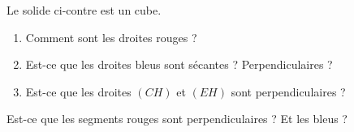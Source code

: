 
\begin{exercice}\label{exoSeconde-0087}

    \begin{multicols}{2}
            Le solide ci-contre est un cube. 
        \begin{enumerate}
            \item
        Comment sont les droites rouges ?
    \item
        Est-ce que les droites bleus sont sécantes ? Perpendiculaires ?
    \item
        Est-ce que les droites \( (CH)\) et \( (EH)\) sont perpendiculaires ?
        \end{enumerate}

    Est-ce que les segments rouges sont perpendiculaires ? Et les bleus ?

\columnbreak

\begin{center}

\end{center}

    \end{multicols}

\end{exercice}

